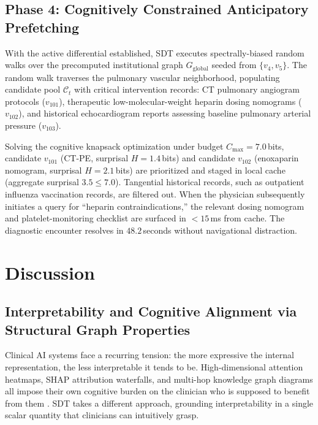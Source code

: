 \documentclass[10pt, onecolumn]{article}
\begin{document}
\subsection{Phase 4: Cognitively Constrained Anticipatory Prefetching}
With the active differential established, SDT executes spectrally-biased random walks over the precomputed institutional graph $G_{\text{global}}$ seeded from $\{v_4, v_5\}$. The random walk traverses the pulmonary vascular neighborhood, populating candidate pool $\mathcal{C}_t$ with critical intervention records: CT pulmonary angiogram protocols ($v_{101}$), therapeutic low-molecular-weight heparin dosing nomograms ($v_{102}$), and historical echocardiogram reports assessing baseline pulmonary arterial pressure ($v_{103}$).

Solving the cognitive knapsack optimization under budget $C_{\max} = 7.0$\,bits, candidate $v_{101}$ (CT-PE, surprisal $H = 1.4$\,bits) and candidate $v_{102}$ (enoxaparin nomogram, surprisal $H = 2.1$\,bits) are prioritized and staged in local cache (aggregate surprisal $3.5 \le 7.0$). Tangential historical records, such as outpatient influenza vaccination records, are filtered out. When the physician subsequently initiates a query for ``heparin contraindications,'' the relevant dosing nomogram and platelet-monitoring checklist are surfaced in $< 15$\,ms from cache. The diagnostic encounter resolves in $48.2$\,seconds without navigational distraction.

\section{Discussion}
\label{sec:discussion}

\subsection{Interpretability and Cognitive Alignment via Structural Graph Properties}

Clinical AI systems face a recurring tension: the more expressive the internal representation, the less interpretable it tends to be. High-dimensional attention heatmaps, SHAP attribution waterfalls, and multi-hop knowledge graph diagrams all impose their own cognitive burden on the clinician who is supposed to benefit from them \cite{ghassemi2021false}. SDT takes a different approach, grounding interpretability in a single scalar quantity that clinicians can intuitively grasp.
\end{document}
